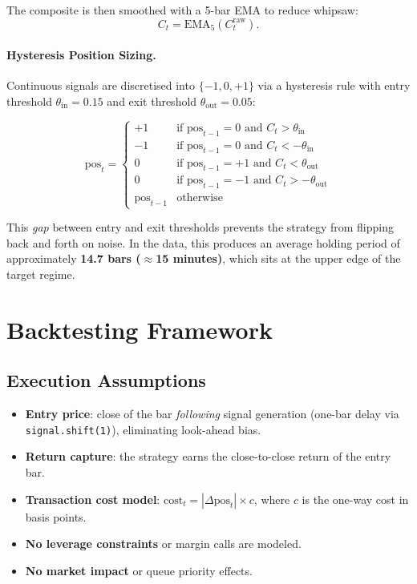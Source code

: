 \documentclass[11pt, a4paper]{article}
\begin{document}
The composite is then smoothed with a 5-bar EMA to reduce whipsaw:
\[
C_t = \mathrm{EMA}_5\!\left(C^{\mathrm{raw}}_t\right).
\]

\paragraph{Hysteresis Position Sizing.}
Continuous signals are discretised into $\{-1, 0, +1\}$ via a hysteresis rule
with entry threshold $\theta_{\mathrm{in}} = 0.15$ and exit threshold
$\theta_{\mathrm{out}} = 0.05$:

\[
\mathrm{pos}_t =
\begin{cases}
+1 & \text{if } \mathrm{pos}_{t-1} = 0 \text{ and } C_t > \theta_{\mathrm{in}} \\
-1 & \text{if } \mathrm{pos}_{t-1} = 0 \text{ and } C_t < -\theta_{\mathrm{in}} \\
0  & \text{if } \mathrm{pos}_{t-1} = +1 \text{ and } C_t < \theta_{\mathrm{out}} \\
0  & \text{if } \mathrm{pos}_{t-1} = -1 \text{ and } C_t > -\theta_{\mathrm{out}} \\
\mathrm{pos}_{t-1} & \text{otherwise}
\end{cases}
\]

This \textit{gap} between entry and exit thresholds prevents the strategy from
flipping back and forth on noise.  In the data, this produces an average
holding period of approximately \textbf{14.7 bars ($\approx$15 minutes)},
which sits at the upper edge of the target regime.

\section{Backtesting Framework}

\subsection{Execution Assumptions}

\begin{itemize}[leftmargin=2em, itemsep=0pt]
  \item \textbf{Entry price}: close of the bar \textit{following} signal generation
        (one-bar delay via \texttt{signal.shift(1)}), eliminating look-ahead bias.
  \item \textbf{Return capture}: the strategy earns the close-to-close return of
        the entry bar.
  \item \textbf{Transaction cost model}:
        $\mathrm{cost}_t = |\Delta \mathrm{pos}_t| \times c$,
        where $c$ is the one-way cost in basis points.
  \item \textbf{No leverage constraints} or margin calls are modeled.
  \item \textbf{No market impact} or queue priority effects.
\end{itemize}
\end{document}
